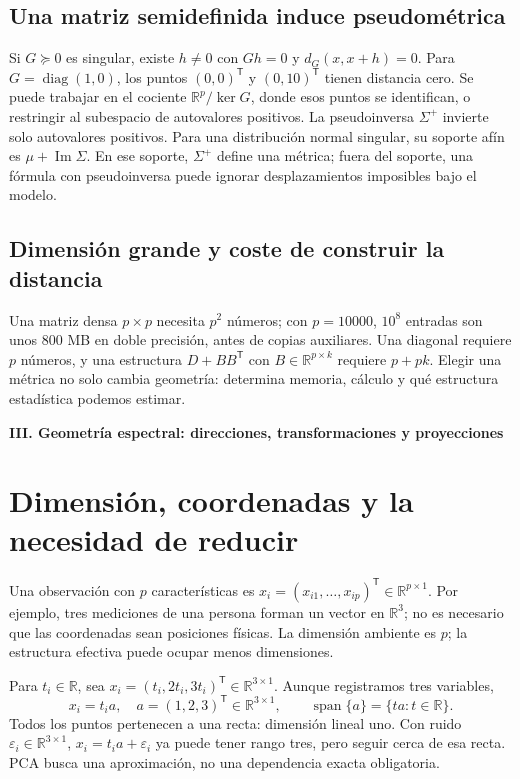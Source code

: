 \documentclass[11pt,a4paper]{article}
\newcommand{\R}{\mathbb R}
\newcommand{\T}{^{\mathsf T}}
\DeclareMathOperator{\spanop}{span}
\DeclareMathOperator{\diag}{diag}
\DeclareMathOperator{\kerop}{ker}
\DeclareMathOperator{\range}{Im}
\theoremstyle{definition}
\newcommand{\parte}[1]{\par\bigskip\Needspace{8\baselineskip}\begin{center}{\Large\bfseries\color{azul}#1}\end{center}}
\begin{document}
\subsection{Una matriz semidefinida induce pseudométrica}
Si $G\succeq0$ es singular, existe $h\ne0$ con $Gh=0$ y $d_G(x,x+h)=0$. Para $G=\diag(1,0)$, los puntos $(0,0)\T$ y $(0,10)\T$ tienen distancia cero. Se puede trabajar en el cociente $\R^p/\kerop G$, donde esos puntos se identifican, o restringir al subespacio de autovalores positivos.
La pseudoinversa $\Sigma^+$ invierte solo autovalores positivos. Para una distribución normal singular, su soporte afín es $\mu+\range\Sigma$. En ese soporte, $\Sigma^+$ define una métrica; fuera del soporte, una fórmula con pseudoinversa puede ignorar desplazamientos imposibles bajo el modelo.
\subsection{Dimensión grande y coste de construir la distancia}
Una matriz densa $p\times p$ necesita $p^2$ números; con $p=10000$, $10^8$ entradas son unos $800$ MB en doble precisión, antes de copias auxiliares. Una diagonal requiere $p$ números, y una estructura $D+BB\T$ con $B\in\R^{p\times k}$ requiere $p+pk$. Elegir una métrica no solo cambia geometría: determina memoria, cálculo y qué estructura estadística podemos estimar.

\parte{III. Geometría espectral: direcciones, transformaciones y proyecciones}
\section{Dimensión, coordenadas y la necesidad de reducir}
Una observación con $p$ características es $x_i=(x_{i1},\ldots,x_{ip})\T\in\R^{p\times1}$. Por ejemplo, tres mediciones de una persona forman un vector en $\R^3$; no es necesario que las coordenadas sean posiciones físicas. La dimensión ambiente es $p$; la estructura efectiva puede ocupar menos dimensiones.
\begin{ejemplo}
Para $t_i\in\R$, sea $x_i=(t_i,2t_i,3t_i)\T\in\R^{3\times1}$. Aunque registramos tres variables,
\[
x_i=t_i a,\quad a=(1,2,3)\T\in\R^{3\times1},\qquad
\spanop\{a\}=\{ta:t\in\R\}.
\]
Todos los puntos pertenecen a una recta: dimensión lineal uno. Con ruido $\varepsilon_i\in\R^{3\times1}$, $x_i=t_i a+\varepsilon_i$ ya puede tener rango tres, pero seguir cerca de esa recta. PCA busca una aproximación, no una dependencia exacta obligatoria.
\end{ejemplo}
\end{document}

